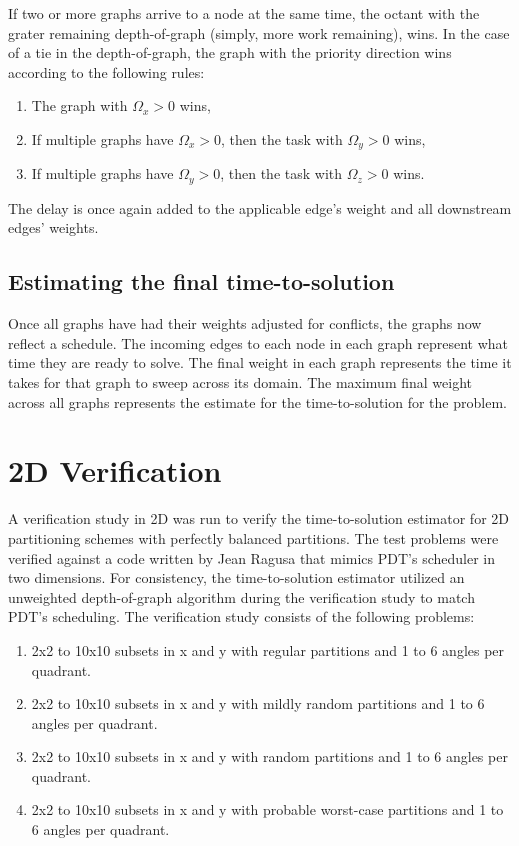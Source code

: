 If two or more graphs arrive to a node at the same time, the octant with the grater remaining depth-of-graph (simply, more work remaining), wins. In the case of a tie in the depth-of-graph, the graph with the priority direction wins according to the following rules:
\begin{enumerate}
    \item The graph with $\Omega_x > 0$ wins,
	\item If multiple graphs have $\Omega_x > 0$, then the task with $\Omega_y > 0$ wins,
	\item If multiple graphs have $\Omega_y > 0$, then the task with $\Omega_z > 0$ wins.
\end{enumerate}
The delay is once again added to the applicable edge's weight and all downstream edges' weights.

\subsection{Estimating the final time-to-solution}

Once all graphs have had their weights adjusted for conflicts, the graphs now reflect a schedule. The incoming edges to each node in each graph represent what time they are ready to solve. The final weight in each graph represents the time it takes for that graph to sweep across its domain. The maximum final weight across all graphs represents the estimate for the time-to-solution for the problem.

\section{2D Verification}

A verification study in 2D was run to verify the time-to-solution estimator for 2D partitioning schemes with perfectly balanced partitions. The test problems were verified against a code written by Jean Ragusa that mimics PDT's scheduler in two dimensions. For consistency, the time-to-solution estimator utilized an unweighted depth-of-graph algorithm during the verification study to match PDT's scheduling. The verification study consists of the following problems:
\begin{enumerate}
	\item 2x2 to 10x10 subsets in x and y with regular partitions and 1 to 6 angles per quadrant.
	\item 2x2 to 10x10 subsets in x and y with mildly random partitions and 1 to 6 angles per quadrant.
	\item  2x2 to 10x10 subsets in x and y with random partitions and 1 to 6 angles per quadrant.
	\item  2x2 to 10x10 subsets in x and y with probable worst-case partitions and 1 to 6 angles per quadrant.
\end{enumerate}

